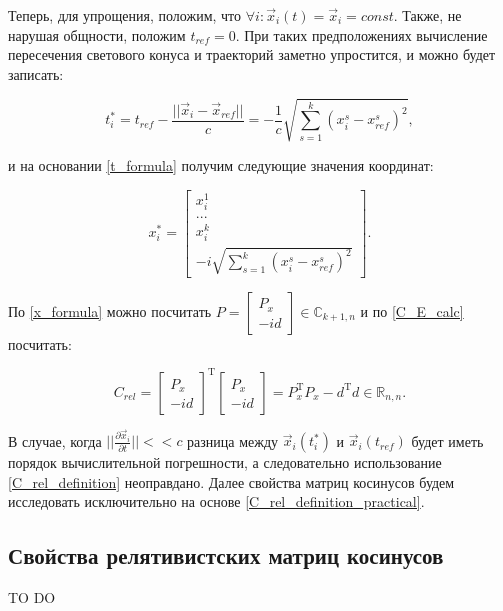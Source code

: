 Теперь, для упрощения, положим, что $\forall{i}: \vec{x}_i(t) = \vec{x}_i = const$. Также, не нарушая общности, положим $t_{ref} = 0$. При таких предположениях вычисление пересечения светового конуса и траекторий заметно упростится, и можно будет записать:

\begin{equation}
	t^*_i = t_{ref} - \frac{||\vec{x}_i - \vec{x}_{ref}||}{c} = -\frac{1}{c}\sqrt{\sum_{s=1}^{k}(x^s_i - x^s_{ref})^2},
	\label{t_formula}
\end{equation}

и на основании \ref{t_formula} получим следующие значения координат:

\begin{equation}
	x^*_i = \begin{bmatrix} x^1_i \\ ... \\ x^k_i \\ -i\sqrt{\sum_{s=1}^{k}(x^s_i - x^s_{ref})^2} \end{bmatrix}.
	\label{x_formula}
\end{equation}

По \ref{x_formula} можно посчитать $P = \begin{bmatrix} P_x \\ -id \end{bmatrix} \in \mathbb{C}_{k+1,n}$ и по \ref{C_E_calc} посчитать:

\begin{equation}
	C_{rel} = {\begin{bmatrix} P_x \\ -id \end{bmatrix}}^\mathrm{T}\begin{bmatrix} P_x \\ -id \end{bmatrix} = P^\mathrm{T}_xP_x - d^\mathrm{T}d \in \mathbb{R}_{n,n}.
	\label{C_rel_definition_practical}
\end{equation}

В случае, когда $||\frac{\partial{\vec{x}_i}}{\partial{t}}|| << c$ разница между $\vec{x}_i(t^*_i)$ и $\vec{x}_i(t_{ref})$ будет иметь порядок вычислительной погрешности, а следовательно  использование \ref{C_rel_definition} неоправдано. Далее свойства матриц косинусов будем исследовать исключительно на основе \ref{C_rel_definition_practical}.

\subsection{Свойства релятивистских матриц косинусов}

TO DO

